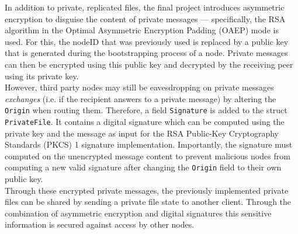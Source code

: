 \documentclass{article}
\begin{document}
 In addition to private, replicated files, the final project introduces asymmetric encryption to disguise the content of private messages --- specifically, the RSA algorithm in the Optimal Asymmetric Encryption Padding (OAEP) mode is used. 
For this, the nodeID that was previously used is replaced by a public key that is generated during the bootstrapping process of a node. Private messages can then be encrypted using this public key and decrypted by the receiving peer using its private key.
\\
However, third party nodes may still be eavesdropping on private messages \emph{exchanges} (i.e. if the recipient answers to a private message) by altering the \texttt{Origin} when routing them. Therefore, a field \texttt{Signature} is added to the struct \texttt{PrivateFile}. It contains a digital signature which can be computed using the private key and the message as input for the RSA Public-Key Cryptography Standards (PKCS) 1 signature implementation. Importantly, the signature must computed on the unencrypted message content to prevent malicious nodes from computing a new valid signature after changing the \texttt{Origin} field to their own public key. 
\\
Through these encrypted private messages, the previously implemented private files can be shared by sending a private file state to another client. Through the combination of asymmetric encryption and digital signatures this sensitive information is secured against access by other nodes.  

\pagebreak

\end{document}
